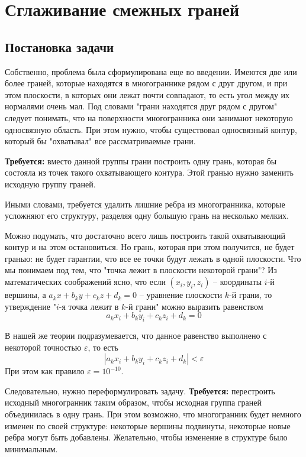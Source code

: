 \documentclass[a4paper,12pt, titlepage]{article}
\begin{document}
\section{Сглаживание смежных граней}
\subsection{Постановка задачи}
\begin{flushleft}
  Собственно, проблема была сформулирована еще во введении. Имеются две или более граней, которые находятся
в многограннике рядом с друг другом, и при этом плоскости, в которых они лежат почти совпадают, то есть угол
между их нормалями очень мал. Под словами "грани находятся друг рядом с другом" следует понимать, что на 
поверхности многогранника они занимают некоторую односвязную область. При этом нужно, чтобы существовал 
односвязный контур, который бы "охватывал" все рассматриваемые грани.
\end{flushleft}
\begin{flushleft}
 \textbf{Требуется:} вместо данной группы грани построить одну грань, которая бы состояла из точек такого 
охватывающего контура. Этой гранью нужно заменить исходную группу граней.
\end{flushleft}
\begin{flushleft}
  Иными словами, требуется удалить лишние ребра из многогранника, которые усложняют его структуру, 
разделяя одну большую грань на несколько мелких.
\end{flushleft}
\begin{flushleft}
 Можно подумать, что достаточно всего лишь построить такой охватывающий контур и на этом остановиться. Но грань, 
которая при этом получится, не будет гранью: не будет гарантии, что все ее точки будут лежать в одной плоскости.
Что мы понимаем под тем, что "точка лежит в плоскости некоторой грани"? Из математических соображений ясно, что
если $(x_{i}, y_{i}, z_{i})$ -- координаты $i$-й вершины, а $a_{k} x + b_{k} y + c_{k} z + d_{k} = 0$ -- 
уравнение плоскости $k$-й грани, то утверждение "$i$-я точка лежит в $k$-й грани" можно выразить равенством
$$
  a_{k} x_{i} + b_{k} y_{i} + c_{k} z_{i} + d_{k} = 0
$$
\end{flushleft}
\begin{flushleft}
 В нашей же теории подразумевается, что данное равенство выполнено с некоторой точностью $\varepsilon$, 
то есть
$$
  |a_{k} x_{i} + b_{k} y_{i} + c_{k} z_{i} + d_{k}| < \varepsilon
$$
При этом как правило $\varepsilon = 10^{-10}$.
\end{flushleft}
\begin{flushleft}
 Следовательно, нужно переформулировать задачу. \textbf{Требуется: } перестроить исходный многогранник таким
образом, чтобы исходная группа граней объединилась в одну грань. При этом возможно, что многогранник будет
немного изменен по своей структуре: некоторые вершины подвинуты, некоторые новые ребра могут быть добавлены.
Желательно, чтобы изменение в структуре было минимальным.
\end{flushleft}
\end{document}
